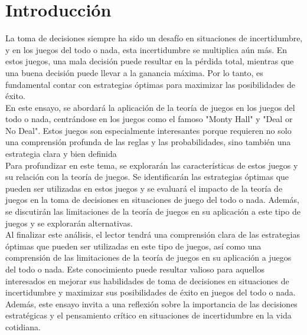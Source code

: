 \section{Introducción}

La toma de decisiones siempre ha sido un desafío en situaciones de incertidumbre, 
y en los juegos del todo o nada, esta incertidumbre se multiplica aún más. 
En estos juegos, una mala decisión puede resultar en la pérdida total, mientras que una 
buena decisión puede llevar a la ganancia máxima. Por lo tanto, es fundamental contar con 
estrategias óptimas para maximizar las posibilidades de éxito.\\

En este ensayo, se abordará la aplicación de la teoría de juegos en los juegos del todo o nada, 
centrándose en los juegos como el famoso "Monty Hall" y "Deal or No Deal". 
Estos juegos son especialmente interesantes porque requieren no solo una comprensión profunda 
de las reglas y las probabilidades, sino también una estrategia clara y bien definida\\

Para profundizar en este tema, se explorarán las características de estos juegos y su relación 
con la teoría de juegos. Se identificarán las estrategias óptimas que pueden ser utilizadas en 
estos juegos y se evaluará el impacto de la teoría de juegos en la toma de decisiones 
en situaciones de juego del todo o nada. Además, se discutirán las limitaciones de la teoría de 
juegos en su aplicación a este tipo de juegos y se explorarán alternativas.\\

Al finalizar este análisis, el lector tendrá una comprensión clara de las estrategias óptimas 
que pueden ser utilizadas en este tipo de juegos, así como una comprensión de las limitaciones 
de la teoría de juegos en su aplicación a juegos del todo o nada. Este conocimiento puede resultar 
valioso para aquellos interesados en mejorar sus habilidades de toma de decisiones en situaciones 
de incertidumbre y maximizar sus posibilidades de éxito en juegos del todo o nada. 
Además, este ensayo invita a una reflexión sobre la importancia de las decisiones estratégicas 
y el pensamiento crítico en situaciones de incertidumbre en la vida cotidiana.\\
